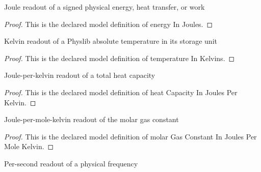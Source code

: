\begin{definition}
  \label{def:physics:phyx-mini-0438:phyxminiproblems-problemphyxmini0438-energyinjoules}
  Joule readout of a signed physical energy, heat transfer, or work
\end{definition}
\begin{proof}
  This is the declared model definition of energy In Joules.
\end{proof}
\begin{definition}
  \label{def:physics:phyx-mini-0438:phyxminiproblems-problemphyxmini0438-temperatureinkelvins}
  Kelvin readout of a Physlib absolute temperature in its storage unit
\end{definition}
\begin{proof}
  This is the declared model definition of temperature In Kelvins.
\end{proof}
\begin{definition}
  \label{def:physics:phyx-mini-0438:phyxminiproblems-problemphyxmini0438-heatcapacityinjoulesperkelvin}
  Joule-per-kelvin readout of a total heat capacity
\end{definition}
\begin{proof}
  This is the declared model definition of heat Capacity In Joules Per Kelvin.
\end{proof}
\begin{definition}
  \label{def:physics:phyx-mini-0438:phyxminiproblems-problemphyxmini0438-molargasconstantinjoulespermolekelvin}
  Joule-per-mole-kelvin readout of the molar gas constant
\end{definition}
\begin{proof}
  This is the declared model definition of molar Gas Constant In Joules Per Mole Kelvin.
\end{proof}
\begin{definition}
  \label{def:physics:phyx-mini-0438:phyxminiproblems-problemphyxmini0438-frequencyinhertz}
  Per-second readout of a physical frequency
\end{definition}
